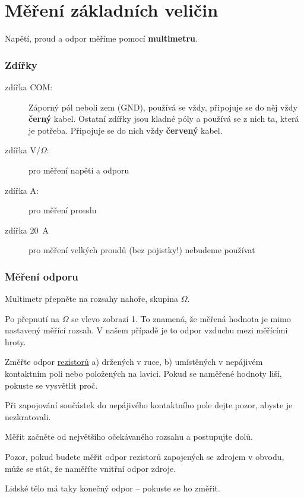\section{Měření základních veličin}

Napětí, proud a odpor měříme pomocí \textbf{multimetru}. 

\subsubsection*{Zdířky}

\begin{description}
	\item[zdířka COM:] Záporný pól neboli zem (GND), používá se vždy, připojuje se do něj vždy \textbf{černý} kabel.
	 Ostatní zdířky jsou kladné póly a používá se z nich ta, která je potřeba. Připojuje se do nich vždy \textbf{červený} kabel. 
	\item[zdířka V/$ \Omega $:] pro měření napětí a odporu
	\item[zdířka A:] pro měření proudu
	\item[zdířka 20~A]  pro měření velkých proudů (bez pojistky!) nebudeme používat
\end{description}


\subsubsection*{Měření odporu} 

Multimetr přepněte na rozsahy nahoře, skupina $ \Omega $. 

Po přepnutí na $ \Omega $ se vlevo zobrazí 1. 
To znamená, že měřená hodnota je mimo nastavený měřící rozsah.
V našem případě je to odpor vzduchu mezi měřícími hroty.

Změřte odpor   \hyperref[rezistor]{rezistorů} a) držených v ruce, b) umístěných v nepájivém kontaktním poli nebo položených na lavici.
Pokud se naměřené hodnoty liší, pokuste se vysvětlit proč. 

Při zapojování součástek do nepájivého kontaktního pole dejte pozor, abyste je nezkratovali.

Měřit začněte od největšího očekávaného rozsahu a postupujte dolů.

Pozor, pokud budete měřit odpor rezistorů zapojených se zdrojem v obvodu, 
může se stát, že naměříte vnitřní odpor zdroje. 

Lidské tělo má taky konečný odpor -- pokuste se ho změřit.



